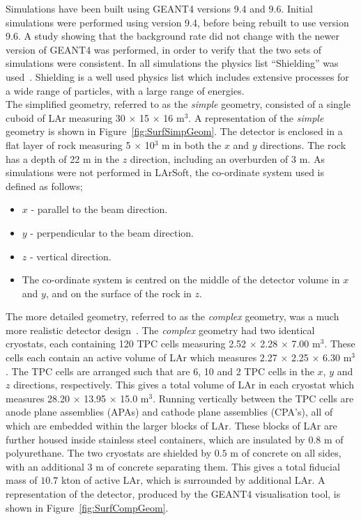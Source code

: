 Simulations have been built using GEANT4 versions 9.4 and 9.6. Initial simulations were performed using version 9.4, before being rebuilt to use version 9.6. A study showing that the background rate did not change with the newer version of GEANT4 was performed, in order to verify that the two sets of simulations were consistent. In all simulations the physics list ``Shielding'' was used~\citep{Shielding}. Shielding is a well used physics list which includes extensive processes for a wide range of particles, with a large range of energies. \\

The simplified geometry, referred to as the \emph{simple} geometry, consisted of a single cuboid of LAr measuring 30 $\times$ 15 $\times$ 16 m$^3$. A representation of the \emph{simple} geometry is shown in Figure~\ref{fig:SurfSimpGeom}. The detector is enclosed in a flat layer of rock measuring 5 $\times$ 10$^3$ m in both the $x$ and $y$ directions. The rock has a depth of 22 m in the $z$ direction, including an overburden of 3 m. As simulations were not performed in LArSoft, the co-ordinate system used is defined as follows;
\begin{itemize}
\item $x$ - parallel to the beam direction.
\item $y$ - perpendicular to the beam direction.
\item $z$ - vertical direction.
\item The co-ordinate system is centred on the middle of the detector volume in $x$ and $y$, and on the surface of the rock in $z$.
\end{itemize}
The more detailed geometry, referred to as the \emph{complex} geometry, was a much more realistic detector design~\citep{LBNE3383}. The \emph{complex} geometry had two identical cryostats, each containing 120 TPC cells measuring 2.52 $\times$ 2.28 $\times$ 7.00 m$^3$. These cells each contain an active volume of LAr which measures 2.27 $\times$ 2.25 $\times$ 6.30 m$^3$. The TPC cells are arranged such that are 6, 10 and 2 TPC cells in the $x$, $y$ and $z$ directions, respectively. This gives a total volume of LAr in each cryostat which measures 28.20 $\times$ 13.95 $\times$ 15.0 m$^3$. Running vertically between the TPC cells are anode plane assemblies (APAs) and cathode plane assemblies (CPA's), all of which are embedded within the larger blocks of LAr. These blocks of LAr are further housed inside stainless steel containers, which are insulated by $0.8$ m of polyurethane. The two cryostats are shielded by $0.5$ m of concrete on all sides, with an additional $3$ m of concrete separating them. This gives a total fiducial mass of $10.7$ kton of active LAr, which is surrounded by additional LAr. A representation of the detector, produced by the GEANT4 visualisation tool, is shown in Figure~\ref{fig:SurfCompGeom}. \\

